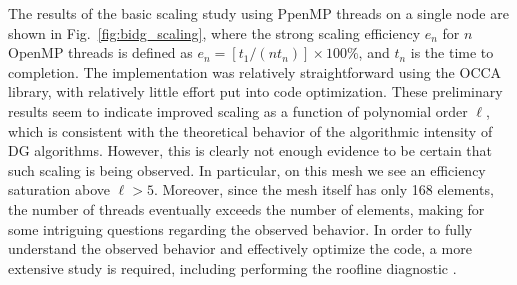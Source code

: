 The results of the basic scaling study using PpenMP threads on a single node are shown in
Fig.~\ref{fig:bidg_scaling}, where the strong scaling efficiency $e_{n}$ for
$n$ OpenMP threads is defined as $e_{n}= [t_{1}/(nt_{n})]\times 100\%$, and $t_n$ is the time to
completion. The implementation was relatively straightforward using the OCCA library, with relatively little effort put into code optimization.  These preliminary results seem to indicate improved scaling as a function of polynomial order $\ell$, which is consistent with the theoretical
behavior of the algorithmic intensity of DG algorithms.  However, this is
clearly not enough evidence to be certain that such scaling is being observed.
In particular, on this mesh we see an efficiency saturation above $\ell>5$.
Moreover, since the mesh itself has only 168 elements, the number of threads
eventually exceeds the number of elements, making for some intriguing questions
regarding the observed behavior.  In order to fully understand the observed behavior and effectively optimize the code, a more extensive study is required, including performing
%
the roofline diagnostic
\cite{Williams:2009:RIV:1498765.1498785}.

%
%




